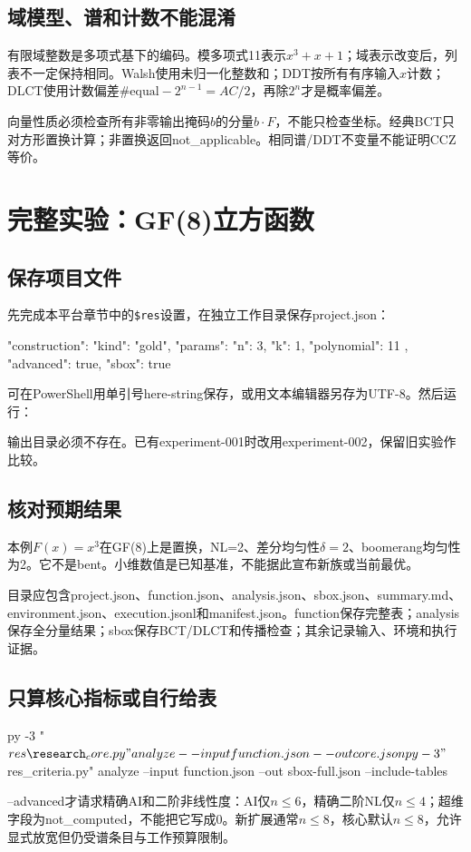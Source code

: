\documentclass[UTF8,fontset=fandol,zihao=-4]{ctexrep}
\begin{document}
\section{域模型、谱和计数不能混淆}
有限域整数是多项式基下的编码。模多项式11表示$x^3+x+1$；域表示改变后，列表不一定保持相同。Walsh使用未归一化整数和；DDT按所有有序输入$x$计数；DLCT使用计数偏差$\#\mathrm{equal}-2^{n-1}=AC/2$，再除$2^n$才是概率偏差。

向量性质必须检查所有非零输出掩码$b$的分量$b\cdot F$，不能只检查坐标。经典BCT只对方形置换计算；非置换返回not\_applicable。相同谱/DDT不变量不能证明CCZ等价。

\chapter{完整实验：GF(8)立方函数}
\section{保存项目文件}
先完成本平台章节中的\texttt{\$res}设置，在独立工作目录保存project.json：
\begin{code}
{
  "construction": {
    "kind": "gold",
    "params": {"n": 3, "k": 1, "polynomial": 11}
  },
  "advanced": true,
  "sbox": true
}
\end{code}
可在PowerShell用单引号here-string保存，或用文本编辑器另存为UTF-8。然后运行：
输出目录必须不存在。已有experiment-001时改用experiment-002，保留旧实验作比较。

\section{核对预期结果}
本例$F(x)=x^3$在GF(8)上是置换，NL=2、差分均匀性$$、boomerang均匀性为2。它不是bent。小维数值是已知基准，不能据此宣布新族或当前最优。

目录应包含project.json、function.json、analysis.json、sbox.json、summary.md、environment.json、execution.jsonl和manifest.json。function保存完整表；analysis保存全分量结果；sbox保存BCT/DLCT和传播检查；其余记录输入、环境和执行证据。

\section{只算核心指标或自行给表}
\begin{code}
py -3 "$res\research_core.py" analyze --input function.json --out core.json
py -3 "$res\sbox_criteria.py" analyze --input function.json --out sbox-full.json --include-tables
\end{code}
--advanced才请求精确AI和二阶非线性度：AI仅$n$，精确二阶NL仅$n$；超维字段为not\_computed，不能把它写成0。新扩展通常$n$，核心默认$n$，允许显式放宽但仍受谱条目与工作预算限制。
\end{document}

